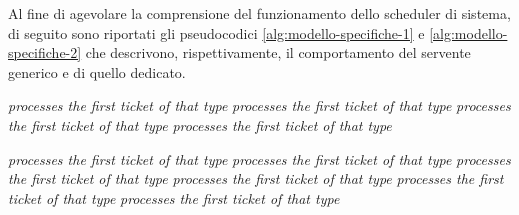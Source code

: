Al fine di agevolare la comprensione del funzionamento dello scheduler di sistema, di seguito sono riportati gli pseudocodici \ref{alg:modello-specifiche-1} e \ref{alg:modello-specifiche-2} che descrivono, rispettivamente, il comportamento del servente generico e di quello dedicato.

\begin{algorithm}
\label{alg:modello-specifiche-1}
\begin{algorithmic}[1]
			\State \textit{processes the first ticket of that type}
		\Else
			\State \textit{processes the first ticket of that type}
			\EndIf
		\EndIf
	\Else
			\State \textit{processes the first ticket of that type}
		\Else
			\State \textit{processes the first ticket of that type}
			\EndIf
		\EndIf
	\EndIf
\EndWhile
\end{algorithmic}
\end{algorithm}

\begin{algorithm}
\label{alg:modello-specifiche-2}
\begin{algorithmic}[1]
			\State \textit{processes the first ticket of that type}
		\Else
				\State \textit{processes the first ticket of that type}
			\Else
					\State \textit{processes the first ticket of that type}
				\EndIf
			\EndIf
		\EndIf
	\Else
			\State \textit{processes the first ticket of that type}
		\Else
				\State \textit{processes the first ticket of that type}
			\Else
					\State \textit{processes the first ticket of that type}
				\EndIf
			\EndIf
		\EndIf
	\EndIf
\EndWhile
\end{algorithmic}
\end{algorithm}

